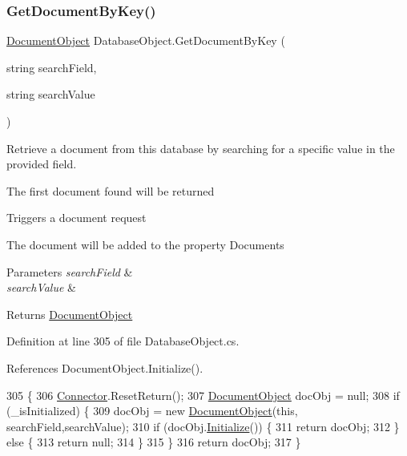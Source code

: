 \subsubsection{\texorpdfstring{Get\+Document\+By\+Key()}{GetDocumentByKey()}}
{\footnotesize\ttfamily \mbox{\hyperlink{class_document_object}{Document\+Object}} Database\+Object.\+Get\+Document\+By\+Key (\begin{DoxyParamCaption}\item[{string}]{search\+Field,  }\item[{string}]{search\+Value }\end{DoxyParamCaption})}



Retrieve a document from this database by searching for a specific value in the provided field. 

The first document found will be returned

Triggers a document request

The document will be added to the property \textquotesingle{}Documents\textquotesingle{}


\begin{DoxyParams}{Parameters}
{\em search\+Field} & \\
\hline
{\em search\+Value} & \\
\hline
\end{DoxyParams}
\begin{DoxyReturn}{Returns}
\mbox{\hyperlink{class_document_object}{Document\+Object}}
\end{DoxyReturn}


Definition at line 305 of file Database\+Object.\+cs.



References Document\+Object.\+Initialize().


\begin{DoxyCode}
305                                                                                    \{
306         \mbox{\hyperlink{class_connector}{Connector}}.ResetReturn();
307         \mbox{\hyperlink{class_document_object}{DocumentObject}} docObj = null;
308         \textcolor{keywordflow}{if} (\_isInitialized) \{
309             docObj = \textcolor{keyword}{new} \mbox{\hyperlink{class_document_object}{DocumentObject}}(\textcolor{keyword}{this}, searchField,searchValue);
310             \textcolor{keywordflow}{if} (docObj.\mbox{\hyperlink{class_document_object_af4298d6cfbb9ea60643d9995309b73f1}{Initialize}}()) \{
311                 \textcolor{keywordflow}{return} docObj;
312             \} \textcolor{keywordflow}{else} \{
313                 \textcolor{keywordflow}{return} null;
314             \}
315         \}
316         \textcolor{keywordflow}{return} docObj;
317     \}
\end{DoxyCode}
\mbox{\label{class_database_object_a7de43a21bd287deec537cffec343f41d}} 
